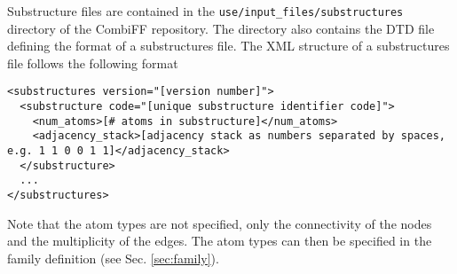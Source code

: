\documentclass[a4paper,11pt]{article}
\begin{document}
Substructure files are contained in the \texttt{use/input\_files/substructures} directory of the CombiFF repository. The directory also contains the DTD file defining the format of a substructures file. The XML structure of a substructures file follows the following format

\begin{lstlisting}
<substructures version="[version number]">
  <substructure code="[unique substructure identifier code]">
    <num_atoms>[# atoms in substructure]</num_atoms>
    <adjacency_stack>[adjacency stack as numbers separated by spaces, e.g. 1 1 0 0 1 1]</adjacency_stack>
  </substructure>
  ...
</substructures>
\end{lstlisting}

Note that the atom types are not specified, only the connectivity of the nodes and the multiplicity of the edges. The atom types can then be specified in the family definition (see Sec. \ref{sec:family}).

\renewcommand\bibname{References}


\end{document}
